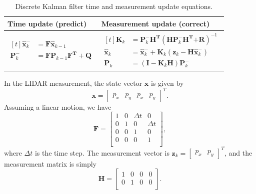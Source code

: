 \documentclass[12pt]{article}
\begin{document}
\begin{table}[h]
	\renewcommand{\arraystretch}{1.5}
	\caption{Discrete Kalman filter time and measurement update equations.}
	\centering
	\label{tab:table-KF}
	\begin{tabular}{C{7cm}|C{7cm}}
		\hline
		Time update (predict) & Measurement update (correct) \\
		\hline
		$\begin{aligned}[t]
			\mathbf{\hat{x}}_{k}^{-} &= \mathbf{F}\mathbf{\hat{x}}_{k - 1} \\
			\mathbf{P}_{k}^{-} &= \mathbf{F}\mathbf{P}_{k - 1}\mathbf{F}^{\mathbf{T}} + \mathbf{Q}
		\end{aligned}$ &
		$\begin{aligned}[t]
			\mathbf{K}_{k} &= \mathbf{P}_{k}^{-}\mathbf{H}^{\mathbf{T}}( \mathbf{H}\mathbf{P}_{k}^{-}\mathbf{H}^{\mathbf{T}}\mathbf{+ R})^{- 1} \\
			\mathbf{\hat{x}}_{k} &= \mathbf{\hat{x}}_{k}^{-} + \mathbf{K}_{k}( \mathbf{z}_{k} - \mathbf{H}\mathbf{\hat{x}}_{k}^{-}) \\
			\mathbf{P}_{k} &= ( \mathbf{I} - \mathbf{K}_{k}\mathbf{H})\mathbf{P}_{k}^{-}
		\end{aligned}$ \\
		\hline
	\end{tabular}
\end{table}

In the LIDAR measurement, the state vector \(\mathbf{x}\) is given by
%
\begin{equation}
	\mathbf{x} = \begin{bmatrix} p_{x} & p_{y} & \dot{p}_{x} & \dot{p}_{y}\end{bmatrix}^{T}.
\end{equation}
%
Assuming a linear motion, we have
%
\begin{equation}
	\mathbf{F} = \begin{bmatrix}
	1 & 0 & \Delta t & 0 \\
	0 & 1 & 0 & \Delta t \\
	0 & 0 & 1 & 0 \\
	0 & 0 & 0 & 1 \\
	\end{bmatrix},
\end{equation}
%
where \(\Delta t\) is the time step. The measurement vector is \(\mathbf{z}_{k} = \begin{bmatrix} p_{x} & p_{y} \end{bmatrix}^{T}\), and the measurement matrix is simply
%
\begin{equation}
	\mathbf{H} = \begin{bmatrix}
	1 & 0 & 0 & 0 \\
	0 & 1 & 0 & 0 \\
	\end{bmatrix}.
\end{equation}
\end{document}
